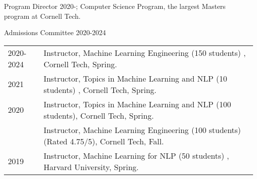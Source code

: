 \documentclass[10pt]{article}
\begin{document}
\ind Program Director 2020-; Computer Science Program, the largest Masters program at Cornell Tech.

\ind Admissions Committee 2020-2024
\bigskip



\hspace{-1cm} \begin{tabular}{lp{11.5cm}}
	2020-2024 & \ind  Instructor, Machine Learning Engineering (150 students) , Cornell Tech, Spring.                                                                       \\
	2021      & \ind  Instructor, Topics in Machine Learning and NLP (10 students) , Cornell Tech, Spring.                                                                  \\
	2020      & \ind  Instructor, Topics in Machine Learning and NLP (100 students), Cornell Tech, Spring.                                                                  \\
	          & \ind  Instructor,  Machine Learning Engineering (100 students) (Rated 4.75/5), Cornell Tech, Fall.                                                          \\

	2019      & \ind  Instructor, Machine Learning for NLP (50 students) , Harvard University, Spring.                                                                      \\


\end{tabular}
\end{document}
